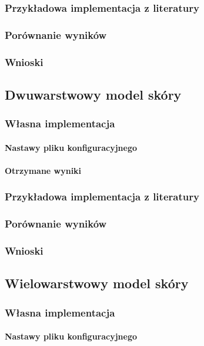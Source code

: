 \subsubsection{Przykładowa implementacja z literatury}
\subsubsection{Porównanie wyników}
\subsubsection{Wnioski}

\subsection{Dwuwarstwowy model skóry}
\subsubsection{Własna implementacja}
\paragraph{Nastawy pliku konfiguracyjnego}
\paragraph{Otrzymane wyniki}
\subsubsection{Przykładowa implementacja z literatury}
\subsubsection{Porównanie wyników}
\subsubsection{Wnioski}

\subsection{Wielowarstwowy model skóry}
\subsubsection{Własna implementacja}
\paragraph{Nastawy pliku konfiguracyjnego}

